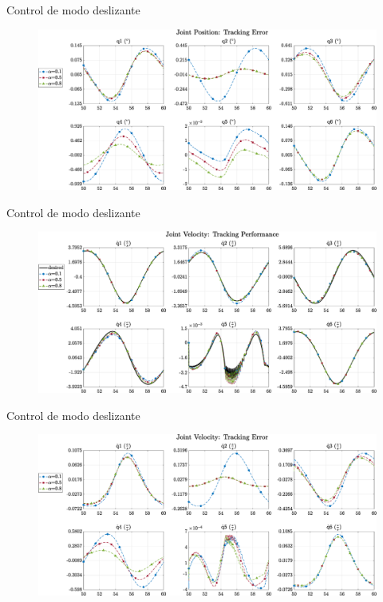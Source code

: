 \documentclass[10pt]{beamer} %
\begin{document}
	\begin{frame}[fragile]{Control de modo deslizante}
		\begin{figure}
			\centering
			\hspace*{-0.7cm}\includegraphics[width=1.1\textwidth]{img/SMCi/circular_traj/60_seg/articular_SMCi_position_error_compare.eps}
		\end{figure}
	\end{frame}	
	
	\begin{frame}[fragile]{Control de modo deslizante}
		\begin{figure}
			\centering
			\hspace*{-0.7cm}\includegraphics[width=1.1\textwidth]{img/SMCi/circular_traj/60_seg/articular_SMCi_velocity_compare.eps}
		\end{figure}
	\end{frame}

	\begin{frame}[fragile]{Control de modo deslizante}
		\begin{figure}
			\centering
			\hspace*{-0.7cm}\includegraphics[width=1.1\textwidth]{img/SMCi/circular_traj/60_seg/articular_SMCi_velocity_error_compare.eps}
		\end{figure}
	\end{frame}
\end{document}
